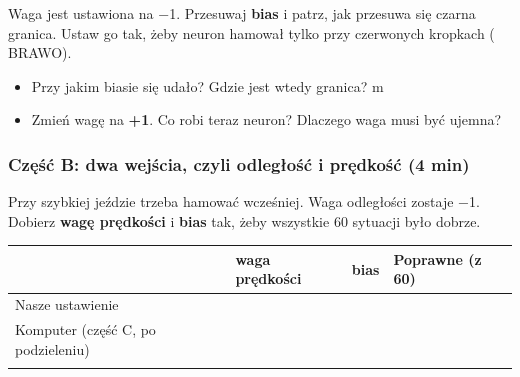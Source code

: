 Waga jest ustawiona na −1. Przesuwaj \textbf{bias} i patrz, jak przesuwa się czarna granica. Ustaw go tak, żeby neuron hamował tylko przy czerwonych kropkach ( BRAWO).

\begin{itemize}
\tightlist
\item
  Przy jakim biasie się udało?  Gdzie jest wtedy granica?  m
\item
  Zmień wagę na \textbf{+1}. Co robi teraz neuron? Dlaczego waga musi być ujemna?
\end{itemize}

\subsubsection{Część B: dwa wejścia, czyli odległość i prędkość (4 min)}\label{czux119ux15bux107-b-dwa-wejux15bcia-czyli-odlegux142oux15bux107-i-prux119dkoux15bux107-4-min}

Przy szybkiej jeździe trzeba hamować wcześniej. Waga odległości zostaje −1. Dobierz \textbf{wagę prędkości} i \textbf{bias} tak, żeby wszystkie 60 sytuacji było dobrze.

\par\noindent\begin{minipage}{\linewidth}
\begin{tabular}{@{}
  >{\raggedright\arraybackslash}p{}
  >{\raggedright\arraybackslash}p{}
  >{\raggedright\arraybackslash}p{}
  >{\raggedright\arraybackslash}p{}@{}}
\toprule\noalign{}
\begin{minipage}[b]{\linewidth}\raggedright
\end{minipage} & \begin{minipage}[b]{\linewidth}\raggedright
waga prędkości
\end{minipage} & \begin{minipage}[b]{\linewidth}\raggedright
bias
\end{minipage} & \begin{minipage}[b]{\linewidth}\raggedright
Poprawne (z 60)
\end{minipage} \\
\midrule\noalign{}
Nasze ustawienie & & & \\
Komputer (część C, po podzieleniu) & & & \\
\bottomrule\noalign{}
\end{tabular}
\end{minipage}\par\medskip

